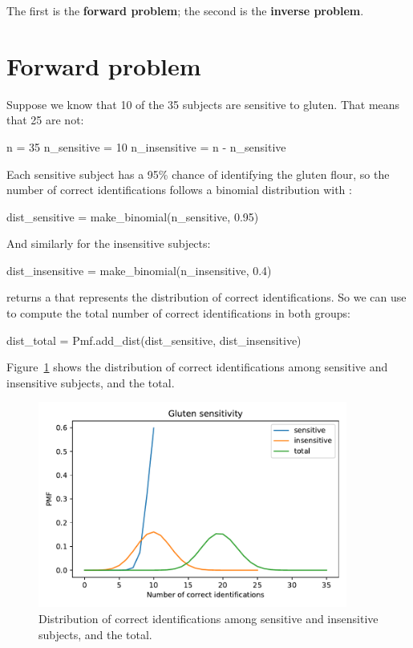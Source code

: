 \documentclass[12pt]{book}
\theoremstyle{exercise}
\begin{document}
The first is the {\bf forward problem}; the second is the {\bf inverse problem}.


\section{Forward problem}

Suppose we know that 10 of the 35 subjects are sensitive to gluten.  That means that 25 are not:

\begin{code}
n = 35
n_sensitive = 10
n_insensitive = n - n_sensitive
\end{code}

Each sensitive subject has a 95\% chance of identifying the gluten flour, so the number of correct identifications follows a binomial distribution with :

\begin{code}
dist_sensitive = make_binomial(n_sensitive, 0.95)
\end{code}

And similarly for the insensitive subjects:

\begin{code}
dist_insensitive = make_binomial(n_insensitive, 0.4)
\end{code}

 returns a  that represents the distribution of correct identifications.
So we can use  to compute the total number of correct identifications in both groups:

\begin{code}
dist_total = Pmf.add_dist(dist_sensitive, dist_insensitive)
\end{code}

Figure~\ref{fig05-02} shows the distribution of correct identifications among sensitive and insensitive subjects, and the total.

\begin{figure}
\centerline{\includegraphics[width=4in]{figs/fig05-02.pdf}}
\caption{Distribution of correct identifications among sensitive and insensitive subjects, and the total.}
\label{fig05-02}
\end{figure}
\end{document}
